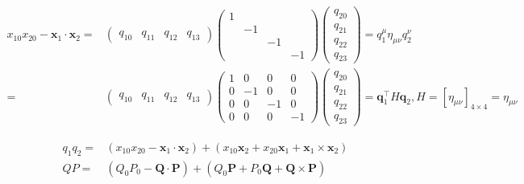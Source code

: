 \documentclass[
]{book}
\theoremstyle{definition}
\theoremstyle{definition}
\theoremstyle{definition}
\theoremstyle{definition}
\theoremstyle{remark}
\begin{document}
\[\begin{aligned}
x_{{\scriptscriptstyle 10}}x_{{\scriptscriptstyle 20}}-\boldsymbol{x}_{{\scriptscriptstyle 1}}\cdot\boldsymbol{x}_{{\scriptscriptstyle 2}}= & \begin{pmatrix}q_{{\scriptscriptstyle 10}} & q_{{\scriptscriptstyle 11}} & q_{{\scriptscriptstyle 12}} & q_{{\scriptscriptstyle 13}}\end{pmatrix}\begin{pmatrix}1\\
 & -1\\
 &  & -1\\
 &  &  & -1
\end{pmatrix}\begin{pmatrix}q_{{\scriptscriptstyle 20}}\\
q_{{\scriptscriptstyle 21}}\\
q_{{\scriptscriptstyle 22}}\\
q_{{\scriptscriptstyle 23}}
\end{pmatrix}=q_{{\scriptscriptstyle 1}}^{{\scriptscriptstyle \mu}}\eta_{{\scriptscriptstyle \mu\nu}}q_{{\scriptscriptstyle 2}}^{{\scriptscriptstyle \nu}}\\
= & \begin{pmatrix}q_{{\scriptscriptstyle 10}} & q_{{\scriptscriptstyle 11}} & q_{{\scriptscriptstyle 12}} & q_{{\scriptscriptstyle 13}}\end{pmatrix}\begin{pmatrix}1 & 0 & 0 & 0\\
0 & -1 & 0 & 0\\
0 & 0 & -1 & 0\\
0 & 0 & 0 & -1
\end{pmatrix}\begin{pmatrix}q_{{\scriptscriptstyle 20}}\\
q_{{\scriptscriptstyle 21}}\\
q_{{\scriptscriptstyle 22}}\\
q_{{\scriptscriptstyle 23}}
\end{pmatrix}=\boldsymbol{q}_{{\scriptscriptstyle 1}}^{\intercal}H\boldsymbol{q}_{{\scriptscriptstyle 2}},H=\left[\eta_{{\scriptscriptstyle \mu\nu}}\right]_{4\times4}=\eta_{{\scriptscriptstyle \mu\nu}}
\end{aligned}
\]

\[
\begin{aligned}
q_{{\scriptscriptstyle 1}}q_{{\scriptscriptstyle 2}}= & \left(x_{{\scriptscriptstyle 10}}x_{{\scriptscriptstyle 20}}-\boldsymbol{x}_{{\scriptscriptstyle 1}}\cdot\boldsymbol{x}_{{\scriptscriptstyle 2}}\right)+\left(x_{{\scriptscriptstyle 10}}\boldsymbol{x}_{{\scriptscriptstyle 2}}+x_{{\scriptscriptstyle 20}}\boldsymbol{x}_{{\scriptscriptstyle 1}}+\boldsymbol{x}_{{\scriptscriptstyle 1}}\times\boldsymbol{x}_{{\scriptscriptstyle 2}}\right)\\
QP= & \left(Q_{{\scriptscriptstyle 0}}P_{{\scriptscriptstyle 0}}-\boldsymbol{Q}\cdot\boldsymbol{P}\right)+\left(Q_{{\scriptscriptstyle 0}}\boldsymbol{P}+P_{{\scriptscriptstyle 0}}\boldsymbol{Q}+\boldsymbol{Q}\times\boldsymbol{P}\right)
\end{aligned}
\]
\end{document}
